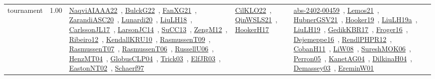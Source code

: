 {\begin{longtable}{p{3cm}r>{\raggedright\arraybackslash}p{6cm}>{\raggedright\arraybackslash}p{6cm}>{\raggedright\arraybackslash}p{8cm}}
\index{tournament}\index{ApplicationAreas!tournament}tournament &  1.00 & \href{../works/NaqviAIAAA22.pdf}{NaqviAIAAA22}~\cite{NaqviAIAAA22}, \href{../works/BulckG22.pdf}{BulckG22}~\cite{BulckG22}, \href{../works/FanXG21.pdf}{FanXG21}~\cite{FanXG21}, \href{../works/ZarandiASC20.pdf}{ZarandiASC20}~\cite{ZarandiASC20}, \href{../works/Lunardi20.pdf}{Lunardi20}~\cite{Lunardi20}, \href{../works/LiuLH18.pdf}{LiuLH18}~\cite{LiuLH18}, \href{../works/CarlssonJL17.pdf}{CarlssonJL17}~\cite{CarlssonJL17}, \href{../works/LarsonJC14.pdf}{LarsonJC14}~\cite{LarsonJC14}, \href{../works/SuCC13.pdf}{SuCC13}~\cite{SuCC13}, \href{../works/ZengM12.pdf}{ZengM12}~\cite{ZengM12}, \href{../works/Ribeiro12.pdf}{Ribeiro12}~\cite{Ribeiro12}, \href{../works/KendallKRU10.pdf}{KendallKRU10}~\cite{KendallKRU10}, \href{../works/RasmussenT09.pdf}{RasmussenT09}~\cite{RasmussenT09}, \href{../works/RasmussenT07.pdf}{RasmussenT07}~\cite{RasmussenT07}, \href{../works/RasmussenT06.pdf}{RasmussenT06}~\cite{RasmussenT06}, \href{../works/RussellU06.pdf}{RussellU06}~\cite{RussellU06}, \href{../works/HenzMT04.pdf}{HenzMT04}~\cite{HenzMT04}, \href{../works/GlobusCLP04.pdf}{GlobusCLP04}~\cite{GlobusCLP04}, \href{../works/Trick03.pdf}{Trick03}~\cite{Trick03}, \href{../works/ElfJR03.pdf}{ElfJR03}~\cite{ElfJR03}, \href{../works/EastonNT02.pdf}{EastonNT02}~\cite{EastonNT02}, \href{../works/Schaerf97.pdf}{Schaerf97}~\cite{Schaerf97} & \href{../works/CilKLO22.pdf}{CilKLO22}~\cite{CilKLO22}, \href{../works/QinWSLS21.pdf}{QinWSLS21}~\cite{QinWSLS21}, \href{../works/HookerH17.pdf}{HookerH17}~\cite{HookerH17} & \href{../works/abs-2402-00459.pdf}{abs-2402-00459}~\cite{abs-2402-00459}, \href{../works/Lemos21.pdf}{Lemos21}~\cite{Lemos21}, \href{../works/HubnerGSV21.pdf}{HubnerGSV21}~\cite{HubnerGSV21}, \href{../works/Hooker19.pdf}{Hooker19}~\cite{Hooker19}, \href{../works/LiuLH19a.pdf}{LiuLH19a}~\cite{LiuLH19a}, \href{../works/LiuLH19.pdf}{LiuLH19}~\cite{LiuLH19}, \href{../works/GedikKBR17.pdf}{GedikKBR17}~\cite{GedikKBR17}, \href{../works/Froger16.pdf}{Froger16}~\cite{Froger16}, \href{../works/Dejemeppe16.pdf}{Dejemeppe16}~\cite{Dejemeppe16}, \href{../works/RendlPHPR12.pdf}{RendlPHPR12}~\cite{RendlPHPR12}, \href{../works/CobanH11.pdf}{CobanH11}~\cite{CobanH11}, \href{../works/LiW08.pdf}{LiW08}~\cite{LiW08}, \href{../works/SureshMOK06.pdf}{SureshMOK06}~\cite{SureshMOK06}, \href{../works/Perron05.pdf}{Perron05}~\cite{Perron05}, \href{../works/KanetAG04.pdf}{KanetAG04}~\cite{KanetAG04}, \href{../works/DilkinaH04.pdf}{DilkinaH04}~\cite{DilkinaH04}, \href{../works/Demassey03.pdf}{Demassey03}~\cite{Demassey03}, \href{../works/EreminW01.pdf}{EreminW01}~\cite{EreminW01}\\

\end{longtable}}
